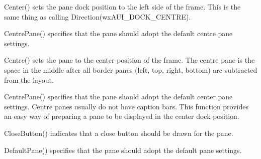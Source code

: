 \label{wxauipaneinfocentre}


Center() sets the pane dock position to the left side of the frame.  This is the same thing as calling Direction(wxAUI_DOCK_CENTRE).

\label{wxauipaneinfocentrepane}


CentrePane() specifies that the pane should adopt the default centre pane settings.

\label{wxauipaneinfocentre}


Centre() sets the pane to the center position of the frame.  The centre pane is the space in the middle after all border panes (left, top, right, bottom) are subtracted from the layout.

\label{wxauipaneinfocentrepane}


CentrePane() specifies that the pane should adopt the default center pane settings.  Centre panes usually do not have caption bars.  This function provides an easy way of preparing a pane to be displayed in the center dock position.

\label{wxauipaneinfoclosebutton}


CloseButton() indicates that a close button should be drawn for the pane.

\label{wxauipaneinfodefaultpane}


DefaultPane() specifies that the pane should adopt the default pane settings.

\label{wxauipaneinfodestroyonclose}


